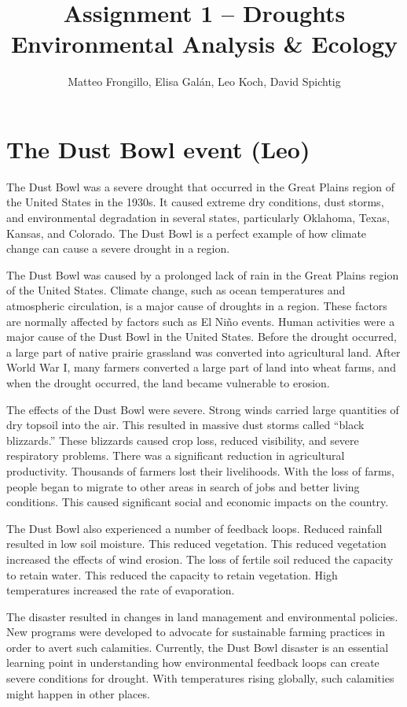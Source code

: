 \documentclass{article}
\title{\textbf{Assignment 1 -- Droughts \\ Environmental Analysis \& Ecology}}
\author{Matteo Frongillo, Elisa Galán, Leo Koch, David Spichtig}
\date{}
\begin{document}
\maketitle
\thispagestyle{fancy}

\vspace*{-.7cm}
\section*{The Dust Bowl event {\footnotesize(Leo)}}

The Dust Bowl was a severe drought that occurred in the Great Plains region of the United States in the 1930s. It caused extreme dry conditions, dust storms, and environmental degradation in several states, particularly Oklahoma, Texas, Kansas, and Colorado. The Dust Bowl is a perfect example of how climate change can cause a severe drought in a region. 

The Dust Bowl was caused by a prolonged lack of rain in the Great Plains region of the United States. Climate change, such as ocean temperatures and atmospheric circulation, is a major cause of droughts in a region. These factors are normally affected by factors such as El Niño events. Human activities were a major cause of the Dust Bowl in the United States. Before the drought occurred, a large part of native prairie grassland was converted into agricultural land. After World War I, many farmers converted a large part of land into wheat farms, and when the drought occurred, the land became vulnerable to erosion. 

The effects of the Dust Bowl were severe. Strong winds carried large quantities of dry topsoil into the air. This resulted in massive dust storms called “black blizzards.” These blizzards caused crop loss, reduced visibility, and severe respiratory problems. There was a significant reduction in agricultural productivity. Thousands of farmers lost their livelihoods. With the loss of farms, people began to migrate to other areas in search of jobs and better living conditions. This caused significant social and economic impacts on the country. 

The Dust Bowl also experienced a number of feedback loops. Reduced rainfall resulted in low soil moisture. This reduced vegetation. This reduced vegetation increased the effects of wind erosion. The loss of fertile soil reduced the capacity to retain water. This reduced the capacity to retain vegetation. High temperatures increased the rate of evaporation. 

The disaster resulted in changes in land management and environmental policies. New programs were developed to advocate for sustainable farming practices in order to avert such calamities. Currently, the Dust Bowl disaster is an essential learning point in understanding how environmental feedback loops can create severe conditions for drought. With temperatures rising globally, such calamities might happen in other places.
\end{document}
